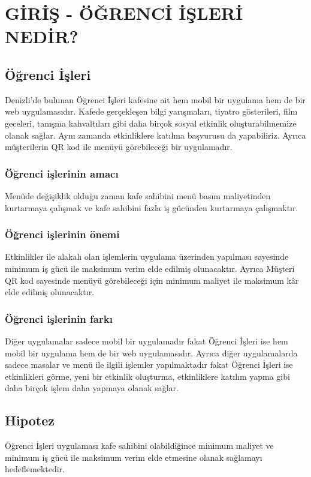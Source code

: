\chapter{GİRİŞ - ÖĞRENCİ İŞLERİ NEDİR?}\label{giris}
\section{Öğrenci İşleri}\label{tezintanimi}
Denizli’de bulunan Öğrenci İşleri kafesine ait hem mobil bir uygulama hem de bir web uygulamasıdır. Kafede gerçekleşen bilgi yarışmaları, tiyatro gösterileri, film geceleri, tanışma kahvaltıları gibi daha birçok sosyal etkinlik oluşturabilmemize olanak sağlar. Aynı zamanda etkinliklere katılma başvurusu da yapabiliriz. Ayrıca müşterilerin QR kod ile menüyü görebileceği bir uygulamadır.

\subsection{Öğrenci işlerinin amacı}\label{tezinamaci}

Menüde değişiklik olduğu zaman kafe sahibini menü basım maliyetinden kurtarmaya çalışmak ve kafe sahibini fazla iş gücünden kurtarmaya çalışmaktır.

\subsection{Öğrenci işlerinin önemi}\label{tezinönemi}

Etkinlikler ile alakalı olan işlemlerin uygulama üzerinden yapılması sayesinde minimum iş gücü ile maksimum verim elde edilmiş olunacaktır. Ayrıca Müşteri QR kod sayesinde menüyü görebileceği için minimum maliyet ile maksimum kâr elde edilmiş olunacaktır.


\subsection{Öğrenci işlerinin farkı}\label{tezinfarkı}

Diğer uygulamalar sadece mobil bir uygulamadır fakat Öğrenci İşleri ise hem mobil bir uygulama hem de bir web uygulamasıdır. Ayrıca diğer uygulamalarda sadece masalar ve menü ile ilgili işlemler yapılmaktadır fakat Öğrenci İşleri ise etkinlikleri görme, yeni bir etkinlik oluşturma, etkinliklere katılım yapma gibi daha birçok işlem daha yapmaya olanak sağlar.

\section{Hipotez}\label{hipotez}

Öğrenci İşleri uygulaması kafe sahibini olabildiğince minimum maliyet ve minimum iş gücü ile maksimum verim elde etmesine olanak sağlamayı hedeflemektedir.